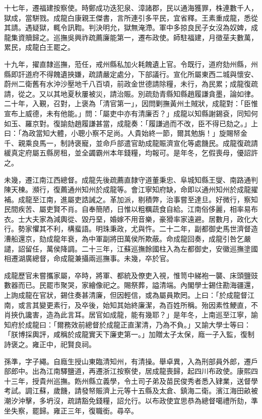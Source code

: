 \begin{pinyinscope}
十七年，遷福建按察使。時鄭成功迭犯泉、漳諸郡，民以通海獲罪，株連數千人，獄成，當駢戮。成龍白康親王傑書，言所連引多平民，宜省釋。王素重成龍，悉從其請。遇疑獄，輒令訊鞫。判決明允，獄無淹滯。軍中多掠良民子女沒為奴婢，成龍集資贖歸之。巡撫吳興祚疏薦廉能第一，遷布政使。師駐福建，月徵莝夫數萬，累民，成龍白王罷之。

十九年，擢直隸巡撫，蒞任，戒州縣私加火耗餽遺上官。令既行，道府劾州縣，州縣即訐道府不得餽遺挾嫌，疏請嚴定處分，下部議行。宣化所屬東西二城與懷安、蔚州二衛舊有水沖沙壓地千八百頃，前政金世德請除糧，未行，為民累；成龍復疏請，從之。又以其地夏秋屢被災，請治賑。別疏劾青縣知縣趙履謙貪墨，論如律。二十年，入覲，召對，上褒為「清官第一」，因問剿撫黃州土賊狀，成龍對：「臣惟宣布上威德，未有他能。」問：「屬吏中亦有清廉否？」成龍以知縣謝錫袞，同知何如玉、羅京對。復諭劾趙履謙甚當，成龍奏：「履謙過而不改，臣不得已劾之。」上曰：「為政當知大體，小聰小察不足尚。人貴始終一節，爾其勉旃！」旋賜帑金千、親乘良馬一，制詩褒寵，並命戶部遣官助成龍賑濟宣化等處饑民。成龍復疏請緩真定府屬五縣房租，並全蠲霸州本年錢糧，均報可。是年冬，乞假喪母，優詔許之。

未幾，遷江南江西總督。成龍先後疏薦直隸守道董秉忠、阜城知縣王燮、南路通判陳天棟。瀕行，復薦通州知州於成龍等。會江寧知府缺，命即以通州知州於成龍擢補。成龍至江南，進屬吏誥誡之。革加派，剔積弊，治事嘗至達旦。好微行，察知民間疾苦、屬吏賢不肖。自奉簡陋，日惟以粗糲蔬食自給。江南俗侈麗，相率易布衣。士大夫家為減輿從、毀丹堊，婚嫁不用音樂，豪猾率家遠避。居數月，政化大行。勢家懼其不利，構蜚語。明珠秉政，尤與忤。二十二年，副都御史馬世濟督造漕船還京，劾成龍年衰，為中軍副將田萬侯所欺蔽。命成龍回奏，成龍引咎乞嚴譴，詔留任，萬侯降調。二十三年，江蘇巡撫餘國柱入為左都御史，安徽巡撫塗國相遷湖廣總督，命成龍兼攝兩巡撫事。未幾，卒於官。

成龍歷官未嘗攜家屬，卒時，將軍、都統及僚吏入視，惟笥中綈袍一襲、床頭鹽豉數器而已。民罷市聚哭，家繪像祀之。賜祭葬，謚清端。內閣學士錫住勘海疆還，上詢成龍在官狀，錫住奏甚清廉，但因輕信，或為屬員欺罔。上曰：「於成龍督江南，或言其變更素行，及卒後，始知其始終廉潔，為百姓所稱。殆因素性鯁直，不肖挾仇讒害，造為此言耳。居官如成龍，能有幾耶？」是年冬，上南巡至江寧，諭知府於成龍曰：「爾務效前總督於成龍正直潔清，乃為不負。」又諭大學士等曰：「朕博採輿評，咸稱於成龍實天下廉吏第一。」加贈太子太保，廕一子入監，復制詩褒之。雍正中，祀賢良祠。

孫準，字子繩。自廕生授山東臨清知州，有清操。舉卓異，入為刑部員外郎，遷戶部郎中。出為江南驛鹽道，再遷浙江按察使，居成龍喪歸，起四川布政使。康熙四十三年，授貴州巡撫。飭州縣立義學，令土司子弟及苗民俊秀者悉入肄業，送督學考試。調江蘇，歲饑，請發帑賑濟上元等十五縣及太倉、鎮海二衛。濱江海田畝被潮汐沖擊，多坍沒，疏請豁免錢糧，詔允行。以布政使宜思恭為總督噶禮所劾，準坐失察，罷歸。雍正三年，復職銜。尋卒。


\end{pinyinscope}
